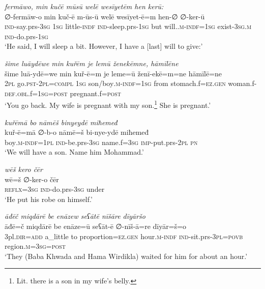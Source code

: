 \ea \label{BP.184}
\textit{fermāwo, min kučē mūsū welē wesīyetēm hen kerū:} \\ 
\gll ∅-fermāw-o min kuč-ē m-ūs-ū welē wesīyet-ē=m hen-∅ ∅-ker-ū \\ 
 \textsc{ind-}say.prs\textsc{-3sg} \textsc{1sg} little\textsc{-indf} \textsc{ind-}sleep.prs\textsc{-\textsc{1sg}} but will.\textsc{.m}\textsc{-indf}\textsc{=\textsc{1sg}} exist\textsc{-3sg}\textsc{.m} \textsc{ind-}do.prs\textsc{-\textsc{1sg}} \\ 
\glt `He said, I will sleep a bit. However, I have a [last] will to give:'
\z 
 
\ea \label{BP.185}
\textit{šime luāydēwe min kuřēm je lemū ženekēmne, hāmīlēne} \\ 
\gll šime luā-ydē=we min kuř-ē=m je leme=ū ženī-ekē=m=ne hāmīlē=ne \\ 
 \textsc{2pl} go\textsc{.pst}-\textsc{2pl}\textsc{=compl} \textsc{1sg} son/boy\textsc{.m}\textsc{-indf}\textsc{=\textsc{1sg}} from stomach.f\textsc{=ez.gen} woman.f\textsc{-def}\textsc{.obl}.f\textsc{=\textsc{1sg}}\textsc{=\textsc{post}} pregnant.f\textsc{=\textsc{post}} \\ 
\glt `You go back. My wife is pregnant with my son.\footnote{Lit. there is a son in my wife’s belly.} She is pregnant.'
\z 
 
\ea \label{BP.186}
\textit{kuřēmā bo nāmēš binyeydē miħemeđ} \\ 
\gll kuř-ē=mā ∅-b-o nāmē=š bi-nye-ydē miħemeđ \\ 
 boy\textsc{.m}\textsc{-indf}\textsc{=\textsc{1pl}} \textsc{ind-}be.prs\textsc{-3sg} name.f\textsc{=3sg} \textsc{imp-}put.prs-\textsc{2pl} \textsc{pn} \\ 
\glt `We will have a son. Name him Mohammad.'
\z 
 
\ea \label{BP.187}
\textit{wēš kero čēr} \\ 
\gll wē=š ∅-ker-o čēr \\ 
 \textsc{reflx}\textsc{=3sg} \textsc{ind-}do.prs\textsc{-3sg} under \\ 
\glt `He put his robe on himself.'
\z 
 
\ea \label{BP.189}
\textit{āđēč miqdārē be enāzew seʕātē nīšāre dīyāršo} \\ 
\gll āđē=č miqdārē be enāze=ū seʕāt-ē ∅-nīš-ā=re dīyār=š=o \\ 
 3pl\textsc{.dir}\textsc{=add} a\_little to proportion\textsc{=ez.gen} hour\textsc{.m}\textsc{-indf} \textsc{ind-}sit.prs\textsc{-3pl}\textsc{=\textsc{povb}} region\textsc{.m}\textsc{=3sg}\textsc{=\textsc{post}} \\ 
\glt `They (Baba Khwada and Hama Wirdikla) waited for him for about an hour.'
\z 
 
